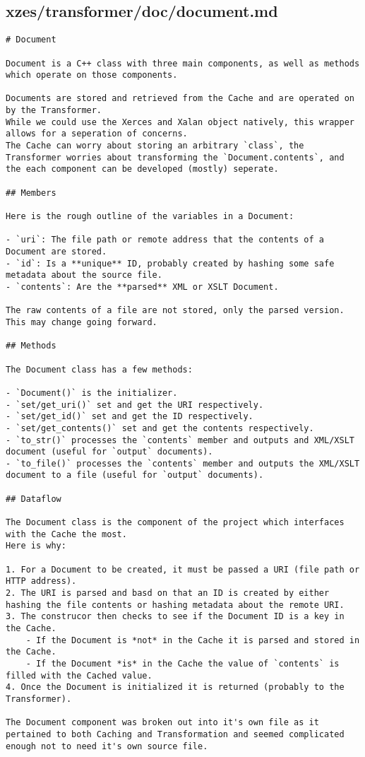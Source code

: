 \subsection{xzes/transformer/doc/document.md}
\begin{lstlisting}
# Document

Document is a C++ class with three main components, as well as methods which operate on those components.

Documents are stored and retrieved from the Cache and are operated on by the Transformer.
While we could use the Xerces and Xalan object natively, this wrapper allows for a seperation of concerns.
The Cache can worry about storing an arbitrary `class`, the Transformer worries about transforming the `Document.contents`, and the each component can be developed (mostly) seperate.

## Members

Here is the rough outline of the variables in a Document:

- `uri`: The file path or remote address that the contents of a Document are stored.
- `id`: Is a **unique** ID, probably created by hashing some safe metadata about the source file.
- `contents`: Are the **parsed** XML or XSLT Document.

The raw contents of a file are not stored, only the parsed version.
This may change going forward.

## Methods

The Document class has a few methods:

- `Document()` is the initializer.
- `set/get_uri()` set and get the URI respectively.
- `set/get_id()` set and get the ID respectively.
- `set/get_contents()` set and get the contents respectively.
- `to_str()` processes the `contents` member and outputs and XML/XSLT document (useful for `output` documents).
- `to_file()` processes the `contents` member and outputs the XML/XSLT document to a file (useful for `output` documents).

## Dataflow

The Document class is the component of the project which interfaces with the Cache the most.
Here is why:

1. For a Document to be created, it must be passed a URI (file path or HTTP address).
2. The URI is parsed and basd on that an ID is created by either hashing the file contents or hashing metadata about the remote URI.
3. The construcor then checks to see if the Document ID is a key in the Cache.
    - If the Document is *not* in the Cache it is parsed and stored in the Cache.
    - If the Document *is* in the Cache the value of `contents` is filled with the Cached value.
4. Once the Document is initialized it is returned (probably to the Transformer).

The Document component was broken out into it's own file as it pertained to both Caching and Transformation and seemed complicated enough not to need it's own source file.
\end{lstlisting}
